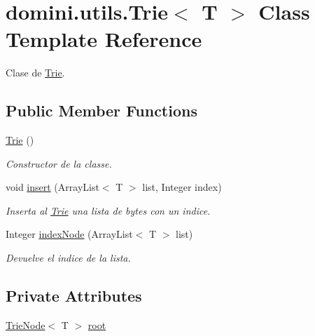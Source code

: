\hypertarget{classdomini_1_1utils_1_1Trie}{}\section{domini.\+utils.\+Trie$<$ T $>$ Class Template Reference}
\label{classdomini_1_1utils_1_1Trie}


Clase de \hyperlink{classdomini_1_1utils_1_1Trie}{Trie}.  


\subsection*{Public Member Functions}
\begin{DoxyCompactItemize}
\item 
\mbox{\label{classdomini_1_1utils_1_1Trie_aa47b21b235e9dab115f3f97726837d5f}} 
\hyperlink{classdomini_1_1utils_1_1Trie_aa47b21b235e9dab115f3f97726837d5f}{Trie} ()
\begin{DoxyCompactList}\small\item\em Constructor de la classe. \end{DoxyCompactList}\item 
void \hyperlink{classdomini_1_1utils_1_1Trie_a3599001d9b056f0b54ab7eabb9d3510b}{insert} (Array\+List$<$ T $>$ list, Integer index)
\begin{DoxyCompactList}\small\item\em Inserta al \hyperlink{classdomini_1_1utils_1_1Trie}{Trie} una lista de bytes con un indice. \end{DoxyCompactList}\item 
Integer \hyperlink{classdomini_1_1utils_1_1Trie_a5c30e36df9ab804bbc054805358ecf2a}{index\+Node} (Array\+List$<$ T $>$ list)
\begin{DoxyCompactList}\small\item\em Devuelve el indice de la lista. \end{DoxyCompactList}\end{DoxyCompactItemize}
\subsection*{Private Attributes}
\begin{DoxyCompactItemize}
\item 
\hyperlink{classdomini_1_1utils_1_1TrieNode}{Trie\+Node}$<$ T $>$ \hyperlink{classdomini_1_1utils_1_1Trie_a60ef63a6c55d07710d33892ccc899bce}{root}
\end{DoxyCompactItemize}


